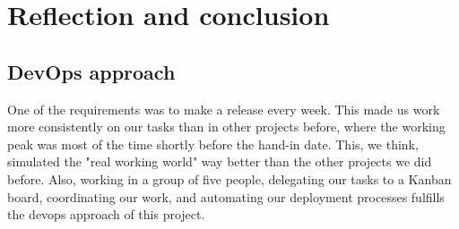 
\section{Reflection and conclusion}
\subsection{DevOps approach}
One of the requirements was to make a release every week. This made us work more consistently on our tasks than in other projects before, 
where the working peak was most of the time shortly before the hand-in date. This, we think, simulated the "real working world" way better than the other projects we did before. 
Also, working in a group of five people, delegating our tasks to a Kanban board, coordinating our work, and automating our deployment processes fulfills the devops 
approach of this project.
